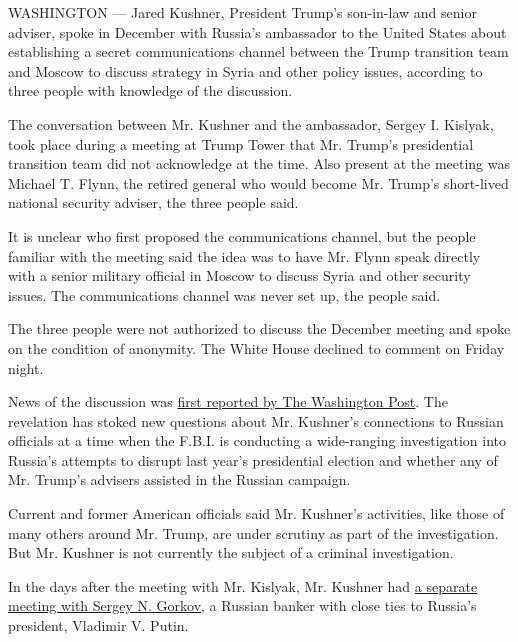 WASHINGTON --- Jared Kushner, President Trump's son-in-law and senior
adviser, spoke in December with Russia's ambassador to the United States
about establishing a secret communications channel between the Trump
transition team and Moscow to discuss strategy in Syria and other policy
issues, according to three people with knowledge of the discussion.

The conversation between Mr. Kushner and the ambassador, Sergey I.
Kislyak, took place during a meeting at Trump Tower that Mr. Trump's
presidential transition team did not acknowledge at the time. Also
present at the meeting was Michael T. Flynn, the retired general who
would become Mr. Trump's short-lived national security adviser, the
three people said.

It is unclear who first proposed the communications channel, but the
people familiar with the meeting said the idea was to have Mr. Flynn
speak directly with a senior military official in Moscow to discuss
Syria and other security issues. The communications channel was never
set up, the people said.

The three people were not authorized to discuss the December meeting and
spoke on the condition of anonymity. The White House declined to comment
on Friday night.

News of the discussion was
\href{https://www.washingtonpost.com/world/national-security/russian-ambassador-told-moscow-that-kushner-wanted-secret-communications-channel-with-kremlin/2017/05/26/520a14b4-422d-11e7-9869-bac8b446820a_story.html?tid=sm_fb\&utm_term=.7fb4395f2b1a}{first
reported by The Washington Post}. The revelation has stoked new
questions about Mr. Kushner's connections to Russian officials at a time
when the F.B.I. is conducting a wide-ranging investigation into Russia's
attempts to disrupt last year's presidential election and whether any of
Mr. Trump's advisers assisted in the Russian campaign.

Current and former American officials said Mr. Kushner's activities,
like those of many others around Mr. Trump, are under scrutiny as part
of the investigation. But Mr. Kushner is not currently the subject of a
criminal investigation.

In the days after the meeting with Mr. Kislyak, Mr. Kushner had
\href{https://www.nytimes3xbfgragh.onion/2017/04/06/us/politics/jared\%2Dkushner\%2Drussians\%2Dsecurity\%2Dclearance.html}{a
separate meeting with Sergey N. Gorkov}, a Russian banker with close
ties to Russia's president, Vladimir V. Putin.

